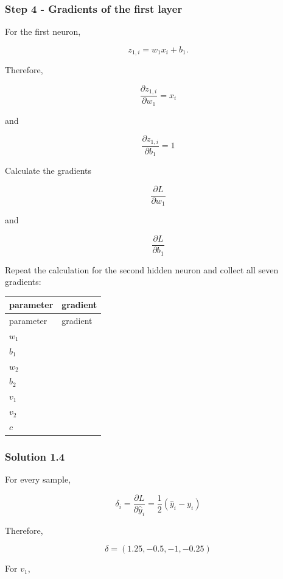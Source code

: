 \documentclass[10pt]{article}
\begin{document}
\subsubsection*{Step 4 - Gradients of the first layer}
For the first neuron,

\[
z_{1,i}=w_1x_i+b_1.
\]

Therefore,

\[
\frac{\partial z_{1,i}}{\partial w_1}=x_i
\]

and

\[
\frac{\partial z_{1,i}}{\partial b_1}=1
\]

Calculate the gradients

\[
\frac{\partial L}{\partial w_1}
\]

and

\[
\frac{\partial L}{\partial b_1}
\]

Repeat the calculation for the second hidden neuron and collect all seven gradients:

\begingroup
\small
\setlength{\tabcolsep}{4pt}
\begin{longtable}{l|l}
parameter & gradient \\[1.5pt]
\hline
\endfirsthead
parameter & gradient \\[1.5pt]
\hline
\endhead
\rule{0pt}{2.4ex}$w_1$ &  $\phantom{-0.00}$ \\[3pt]
\rule{0pt}{2.4ex}$b_1$ &  $\phantom{-0.00}$ \\[3pt]
\rule{0pt}{2.4ex}$w_2$ &  $\phantom{-0.00}$ \\[3pt]
\rule{0pt}{2.4ex}$b_2$ &  $\phantom{-0.00}$ \\[3pt]
\rule{0pt}{2.4ex}$v_1$ &  $\phantom{-0.00}$ \\[3pt]
\rule{0pt}{2.4ex}$v_2$ &  $\phantom{-0.00}$ \\[3pt]
\rule{0pt}{2.4ex}$c$ &  $\phantom{-0.00}$ \\[3pt]
\end{longtable}
\endgroup
\begingroup\color{red}

\subsubsection*{Solution 1.4}
For every sample,

\[
\delta_i=\frac{\partial L}{\partial\hat y_i}=\frac12(\hat y_i-y_i)
\]

Therefore,

\[
\delta=(1.25,-0.5,-1,-0.25)
\]

For $v_1$,
\end{document}
